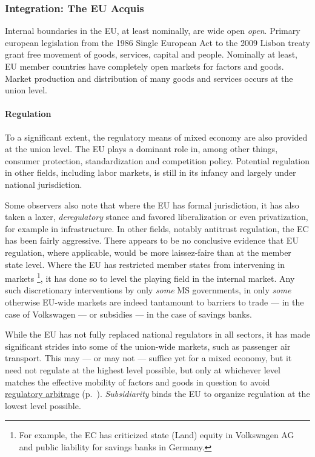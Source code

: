 \documentclass[11pt,a4paper,oneside]{article}
\begin{document}
\subsubsection[Integration]{Integration: The EU Acquis} \label{sec:EU-Acquis}
Internal boundaries in the \gls{EU}, at least nominally, are wide open \emph{open}. %
Primary european legislation from the 1986 Single European Act to the 2009 Lisbon treaty grant free movement of goods, services, capital and people.
Nominally at least, \gls{EU} member countries have completely open markets for factors and goods.
Market production and distribution of many goods and services occurs at the union level.

\paragraph{Regulation} To a significant extent, the regulatory means of mixed economy are also provided at the union level.
The \gls{EU} plays a dominant role in, among other things, consumer protection, standardization and competition policy.
Potential regulation in other fields, including labor markets, is still in its infancy and largely under national jurisdiction. %

Some observers also note that where the \gls{EU} has formal jurisdiction, it has also taken a laxer, \emph{deregulatory} stance and favored liberalization or even privatization, for example in infrastructure. %
In other fields, notably antitrust regulation, the \gls{EC} has been fairly aggressive.
There appears to be no conclusive evidence that \gls{EU} regulation, where applicable, would be more laissez-faire than at the member state level. %
Where the \gls{EU} has restricted member states from intervening in markets
	\footnote{
		For example, the \gls{EC} has criticized state (Land) equity in Volkswagen AG and public liability for savings banks in Germany.
	},
it has done so to level the playing field in the internal market.
Any such discretionary interventions by only \emph{some} \gls{MS} governments, in only \emph{some} otherwise \gls{EU}-wide markets are indeed tantamount to barriers to trade --- in the case of Volkswagen --- or subsidies --- in the case of savings banks.  %

While the \gls{EU} has not fully replaced national regulators in all sectors, it has made significant strides into some of the union-wide markets, such as passenger air transport.
This may --- or may not --- suffice yet for a mixed economy, but it need not regulate at the highest level possible, but only at whichever level matches the effective mobility of factors and goods in question to avoid \hyperref[sec:regulatory]{regulatory arbitrage} (p.~\pageref{sec:regulatory}).
\emph{Subsidiarity} binds the \gls{EU} to organize regulation at the lowest level possible.
\end{document}
